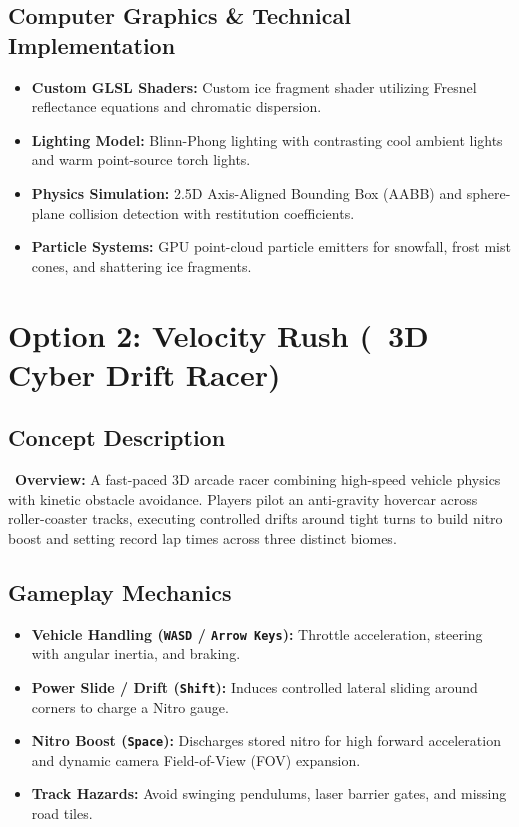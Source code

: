 \documentclass[11pt,a4paper]{article}
\begin{document}
\subsection{Computer Graphics \& Technical Implementation}
\begin{itemize}
    \item \textbf{Custom GLSL Shaders:} Custom ice fragment shader utilizing Fresnel reflectance equations and chromatic dispersion.
    \item \textbf{Lighting Model:} Blinn-Phong lighting with contrasting cool ambient lights and warm point-source torch lights.
    \item \textbf{Physics Simulation:} 2.5D Axis-Aligned Bounding Box (AABB) and sphere-plane collision detection with restitution coefficients.
    \item \textbf{Particle Systems:} GPU point-cloud particle emitters for snowfall, frost mist cones, and shattering ice fragments.
\end{itemize}

\newpage

\section{Option 2: Velocity Rush (\faCar\ 3D Cyber Drift Racer)}

\subsection{Concept Description}
\noindent\faGamepad\ \textbf{Overview:} A fast-paced 3D arcade racer combining high-speed vehicle physics with kinetic obstacle avoidance. Players pilot an anti-gravity hovercar across roller-coaster tracks, executing controlled drifts around tight turns to build nitro boost and setting record lap times across three distinct biomes.

\subsection{Gameplay Mechanics}
\begin{itemize}
    \item \textbf{Vehicle Handling (\texttt{WASD} / \texttt{Arrow Keys}):} Throttle acceleration, steering with angular inertia, and braking.
    \item \textbf{Power Slide / Drift (\texttt{Shift}):} Induces controlled lateral sliding around corners to charge a Nitro gauge.
    \item \textbf{Nitro Boost (\texttt{Space}):} Discharges stored nitro for high forward acceleration and dynamic camera Field-of-View (FOV) expansion.
    \item \textbf{Track Hazards:} Avoid swinging pendulums, laser barrier gates, and missing road tiles.
\end{itemize}
\end{document}
